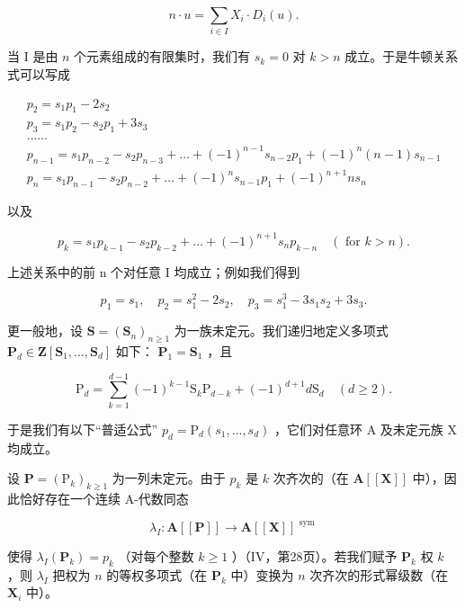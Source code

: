 \[
n \cdot u = \sum_ {i \in I} X _ {i} \cdot D _ {i} (u).\tag{21}
\]

当 I 是由 \(n\) 个元素组成的有限集时，我们有 \(s_k = 0\) 对 \(k > n\) 成立。于是牛顿关系式可以写成

\[
\begin{array}{l} p _ {2} = s _ {1} p _ {1} - 2 s _ {2} \\ p _ {3} = s _ {1} p _ {2} - s _ {2} p _ {1} + 3 s _ {3} \\ \dots \dots \\ p _ {n - 1} = s _ {1} p _ {n - 2} - s _ {2} p _ {n - 3} + \dots + (- 1) ^ {n - 1} s _ {n - 2} p _ {1} + (- 1) ^ {n} (n - 1) s _ {n - 1} \\ p _ {n} = s _ {1} p _ {n - 1} - s _ {2} p _ {n - 2} + \dots + (- 1) ^ {n} s _ {n - 1} p _ {1} + (- 1) ^ {n + 1} n s _ {n} \end{array}
\]

以及

\[
p _ {k} = s _ {1} p _ {k - 1} - s _ {2} p _ {k - 2} + \dots + (- 1) ^ {n + 1} s _ {n} p _ {k - n} \quad (\text { for } k > n).\tag{22}
\]

上述关系中的前 n 个对任意 I 均成立；例如我们得到

\[
p _ {1} = s _ {1}, \quad p _ {2} = s _ {1} ^ {2} - 2 s _ {2}, \quad p _ {3} = s _ {1} ^ {3} - 3 s _ {1} s _ {2} + 3 s _ {3}.
\]

更一般地，设 \(\mathbf{S} = (\mathbf{S}_n)_{n\geqslant 1}\) 为一族未定元。我们递归地定义多项式 \(\mathbf{P}_d\in \mathbf{Z}[\mathbf{S}_1,\dots ,\mathbf{S}_d]\) 如下： \(\mathbf{P}_1 = \mathbf{S}_1\) ，且

\[
\mathrm{P} _ {d} = \sum_ {k = 1} ^ {d - 1} (- 1) ^ {k - 1} \mathrm{S} _ {k} \mathrm{P} _ {d - k} + (- 1) ^ {d + 1} d \mathrm{S} _ {d} \quad (d \geqslant 2).
\]

于是我们有以下“普适公式” \(p_d = \mathrm{P}_d(s_1, \ldots, s_d)\) ，它们对任意环 A 及未定元族 X 均成立。

设 \(\mathbf{P} = (\mathrm{P}_k)_{k\geqslant 1}\) 为一列未定元。由于 \(p_k\) 是 \(k\) 次齐次的（在 \(\mathbf{A}[[\mathbf{X}]]\) 中），因此恰好存在一个连续 A-代数同态

\[
\lambda_ {I}: \mathbf {A} [ [ \mathbf {P} ] ] \rightarrow \mathbf {A} [ [ \mathbf {X} ] ] ^ {\text { sym }}
\]

使得 \(\lambda_{I}(\mathbf{P}_{k}) = p_{k}\) （对每个整数 \(k \geqslant 1\) ）（IV，第28页）。若我们赋予 \(\mathbf{P}_{k}\) 权 \(k\) ，则 \(\lambda_{I}\) 把权为 \(n\) 的等权多项式（在 \(\mathbf{P}_{k}\) 中）变换为 \(n\) 次齐次的形式幂级数（在 \(\mathbf{X}_{i}\) 中）。

